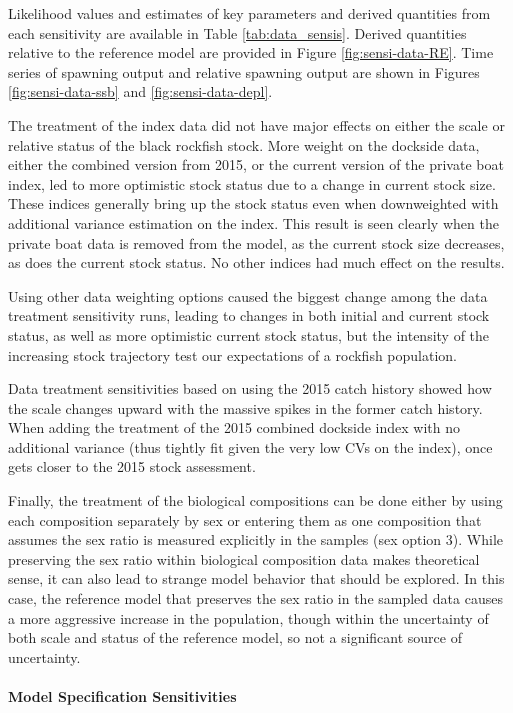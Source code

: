 \documentclass[11pt,
  english,
  letterpaper,
]{article}
\begin{document}
Likelihood values and estimates of key parameters and derived quantities from each sensitivity are available in Table \ref{tab:data_sensis}. Derived quantities relative to the reference model are provided in Figure \ref{fig:sensi-data-RE}. Time series of spawning output and relative spawning output are shown in Figures \ref{fig:sensi-data-ssb} and \ref{fig:sensi-data-depl}.

The treatment of the index data did not have major effects on either the scale or relative status of the black rockfish stock. More weight on the dockside data, either the combined version from 2015, or the current version of the private boat index, led to more optimistic stock status due to a change in current stock size. These indices generally bring up the stock status even when downweighted with additional variance estimation on the index. This result is seen clearly when the private boat data is removed from the model, as the current stock size decreases, as does the current stock status. No other indices had much effect on the results.

Using other data weighting options caused the biggest change among the data treatment sensitivity runs, leading to changes in both initial and current stock status, as well as more optimistic current stock status, but the intensity of the increasing stock trajectory test our expectations of a rockfish population.

Data treatment sensitivities based on using the 2015 catch history showed how the scale changes upward with the massive spikes in the former catch history. When adding the treatment of the 2015 combined dockside index with no additional variance (thus tightly fit given the very low CVs on the index), once gets closer to the 2015 stock assessment.

Finally, the treatment of the biological compositions can be done either by using each composition separately by sex or entering them as one composition that assumes the sex ratio is measured explicitly in the samples (sex option 3). While preserving the sex ratio within biological composition data makes theoretical sense, it can also lead to strange model behavior that should be explored. In this case, the reference model that preserves the sex ratio in the sampled data causes a more aggressive increase in the population, though within the uncertainty of both scale and status of the reference model, so not a significant source of uncertainty.

\hypertarget{senstivities}{%
\paragraph{Model Specification Sensitivities}\label{senstivities}}
\end{document}
